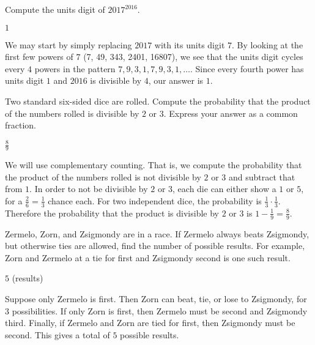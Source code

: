 \documentclass[11pt]{article}
\begin{document}
\begin{problem}
Compute the units digit of $2017^{2016}$.
\end{problem}

\begin{answer}
$\boxed{1}$
\end{answer}

\begin{solution}
We may start by simply replacing $2017$ with its units digit $7$. By looking at the first few powers of $7$ (7, 49, 343, 2401, 16807), we see that the units digit cycles every $4$ powers in the pattern $7, 9, 3, 1, 7, 9, 3, 1, \ldots$. Since every fourth power has units digit $1$ and $2016$ is divisible by $4$, our answer is $\boxed{1}$.
\end{solution}


\begin{problem}
Two standard six-sided dice are rolled. Compute the probability that the product of the numbers rolled is divisible by $2$ or $3$. Express your answer as a common fraction.
\end{problem}

\begin{answer} %
$\boxed{\frac{8}{9}}$
\end{answer}

\begin{solution}
We will use complementary counting. That is, we compute the probability that the product of the numbers rolled is not divisible by $2$ or $3$ and subtract that from $1$. In order to not be divisible by $2$ or $3$, each die can either show a $1$ or $5$, for a $\frac{2}{6} = \frac{1}{3}$ chance each. For two independent dice, the probability is $\frac{1}{3} \cdot \frac{1}{3}$. Therefore the probability that the product is divisible by $2$ or $3$ is $1 - \frac{1}{9} = \boxed{\frac{8}{9}}$.
\end{solution}


\begin{problem}
Zermelo, Zorn, and Zsigmondy are in a race. If Zermelo always beats Zsigmondy, but otherwise ties are allowed, find the number of possible results. For example, Zorn and Zermelo at a tie for first and Zsigmondy second is one such result.
\end{problem}

\begin{answer}
$\boxed{5}$ (results)
\end{answer}

\begin{solution}
Suppose only Zermelo is first. Then Zorn can beat, tie, or lose to Zsigmondy, for $3$ possibilities. If only Zorn is first, then Zermelo must be second and Zsigmondy third. Finally, if Zermelo and Zorn are tied for first, then Zsigmondy must be second. This gives a total of $\boxed{5}$ possible results.
\end{solution}
\end{document}
